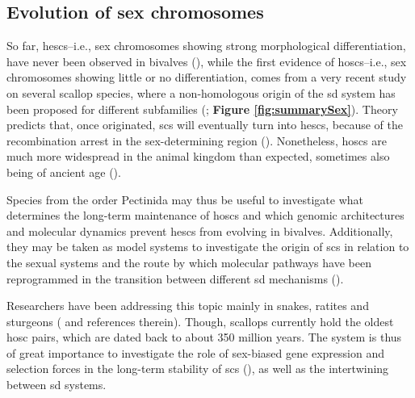 \documentclass[../main.tex]{subfiles}
\begin{document}
\subsection{Evolution of sex chromosomes}
So far, \glspl{hesc}--i.e., sex chromosomes showing strong morphological differentiation, have never been observed in bivalves (\textbf{\cite{breton2018sex}}), while the first evidence of \glspl{hosc}--i.e., sex chromosomes showing little or no differentiation, comes from a very recent study on several scallop species, where a non-homologous origin of the \gls{sd} system has been proposed for different subfamilies (\textbf{\cite{han2022ancient}}; \textbf{Figure \ref{fig:summarySex}}). Theory predicts that, once originated, \glspl{sc} will eventually turn into \glspl{hesc}, because of the recombination arrest in the sex-determining region (\textbf{\cite{bachtrog2014sex, beukeboom2014evolution, han2022ancient}}). Nonetheless, \glspl{hosc} are much more widespread in the animal kingdom than expected, sometimes also being of ancient age (\textbf{\cite{bachtrog2014sex, han2022ancient}}).

Species from the order Pectinida may thus be useful to investigate what determines the long-term maintenance of \glspl{hosc} and which genomic architectures and molecular dynamics prevent \glspl{hesc} from evolving in bivalves. Additionally, they may be taken as model systems to investigate the origin of \glspl{sc} in relation to the sexual systems and the route by which molecular pathways have been reprogrammed in the transition between different \gls{sd} mechanisms (\textbf{\cite{han2022ancient}}).

Researchers have been addressing this topic mainly in snakes, ratites and sturgeons (\textbf{\cite{bachtrog2014sex, han2022ancient}} and references therein). Though, scallops currently hold the oldest \gls{hosc} pairs, which are dated back to about 350 million years. The system is thus of great importance to investigate the role of sex-biased gene expression and selection forces in the long-term stability of \glspl{sc} (\textbf{\cite{han2022ancient}}), as well as the intertwining between \gls{sd} systems.
\end{document}
